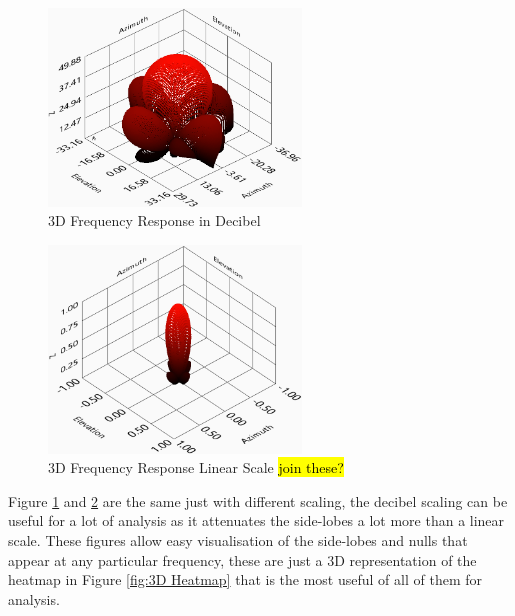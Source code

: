 \documentclass{UoNMCHA}
\numberwithin{equation}{section}
\begin{document}
    \begin{figure}[H]
        \centering
        \includegraphics[keepaspectratio, width = 0.6\textwidth]{Figures/3DdBFigure.png}
        \caption{3D Frequency Response in Decibel}
        \label{fig:3D Decibel}
    \end{figure}
    
    \begin{figure}[H]
        \centering
        \includegraphics[keepaspectratio, width = 0.6\textwidth]{Figures/3DLinearFigure.png}
        \caption{3D Frequency Response Linear Scale \hl{join these?}}
        \label{fig:3D Linear}
    \end{figure}
    
    Figure \ref{fig:3D Decibel} and \ref{fig:3D Linear} are the same just with different scaling, the decibel scaling can be useful for a lot of analysis as it attenuates the side-lobes a lot more than a linear scale. These figures allow easy visualisation of the side-lobes and nulls that appear at any particular frequency, these are just a 3D representation of the heatmap in Figure \ref{fig:3D Heatmap} that is the most useful of all of them for analysis.
    
\end{document}
